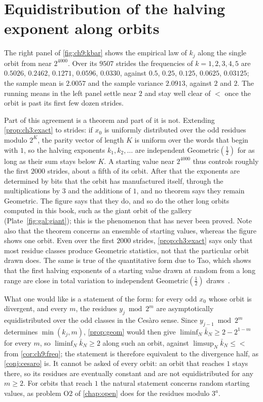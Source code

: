 \section{Equidistribution of the halving exponent along orbits}\label{sec:ch9:equi}

The right panel of \cref{fig:ch9:kbar} shows the empirical law of $k_j$ along
the single orbit from near $2^{4000}$. Over its $9507$ strides the frequencies
of $k=1,2,3,4,5$ are $0.5026$, $0.2462$, $0.1271$, $0.0596$, $0.0330$, against
$0.5$, $0.25$, $0.125$, $0.0625$, $0.03125$; the sample mean is $2.0057$ and the
sample variance $2.0913$, against $2$ and $2$. The running means in the left
panel settle near $2$ and stay well clear of $\lt$ once the orbit is past its
first few dozen strides.

Part of this agreement is a theorem and part of it is not. Extending
\cref{prop:ch3:exact} to strides: if $x_0$ is uniformly distributed over the odd
residues modulo $2^K$, the parity vector of length $K$ is uniform over the words that begin with $1$, so the
halving exponents $k_1,k_2,\ldots$ are independent Geometric$(\tfrac12)$ for
as long as their sum stays below $K$. A starting value near $2^{4000}$ thus
controls roughly the first $2000$ strides, about a fifth of its orbit. After
that the exponents are determined by bits that the orbit has manufactured
itself, through the multiplications by $3$ and the additions of $1$, and no
theorem says they remain Geometric.
The figure says that they do, and so do the other long orbits computed in this book, such as the giant orbit of the gallery (Plate~\ref{fig:gal:giant}); this is the phenomenon that has never been proved.
Note also that the theorem concerns an ensemble of starting values,
whereas the figure shows one orbit. Even over the first $2000$ strides,
\cref{prop:ch3:exact} says only that most residue classes produce Geometric
statistics, not that the particular orbit drawn does.
The same is true of the quantitative form due to Tao, which shows that the first halving exponents of a starting value drawn at random from a long range are close in total variation to independent Geometric$(\tfrac12)$ draws~\cite[Proposition~1.9]{tao2022}.

What one would like is a statement of the form: for every odd $x_0$ whose orbit is divergent, and every $m$, the residues $y_j\bmod2^m$ are asymptotically equidistributed over the odd classes in the Ces\`aro sense. Since $y_{j-1}\bmod2^m$ determines $\min(k_j,m)$, \cref{prop:geom} would then give $\liminf_N\bar k_N\ge2-2^{1-m}$ for every $m$, so $\liminf_N\bar k_N\ge2$ along such an orbit, against $\limsup_N\bar k_N\le\lt$ from \cref{cor:ch9:freq}; the statement is therefore equivalent to the divergence half, as \cref{conj:cesaro} is. It cannot be asked of every orbit: an orbit that reaches $1$ stays there, so its residues are eventually constant and are not equidistributed for any $m\geq2$. For orbits that reach $1$ the natural statement concerns random starting values, as problem O2 of \cref{chap:open} does for the residues modulo $3^a$.

